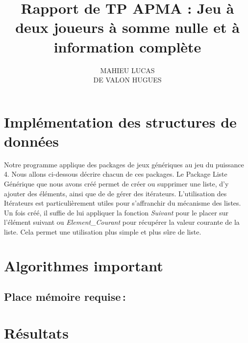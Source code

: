 \documentclass[a4paper, 10pt, french]{article}
\title {Rapport de TP APMA : Jeu à deux joueurs à somme nulle et à information complète}
\author
{
    MAHIEU LUCAS
    \\ DE VALON HUGUES
}
\begin{document}
\maketitle

\section{Implémentation des structures de données}
{
    Notre programme applique des packages de jeux génériques au jeu du puissance 4.
    Nous allons ci-dessous décrire chacun de ces packages.
    Le Package Liste Générique que nous avons créé permet de créer ou supprimer une liste, d'y ajouter des éléments, ainsi que de de gérer des itérateurs. L'utilisation des Itérateurs est particulièrement utiles pour s'affranchir du mécanisme des listes. Un fois créé, il suffie de lui appliquer la fonction {\em Suivant} pour le placer sur l'élément suivant ou {\em Element\_Courant} pour récupérer la valeur courante de la liste. Cela permet une utilisation plus simple et plus sûre de liste.
} 

\section{Algorithmes important}
{
    \subsection{Place mémoire requise\,: }
    {

    }
}   

\section{Résultats}
{
}
\end{document}
